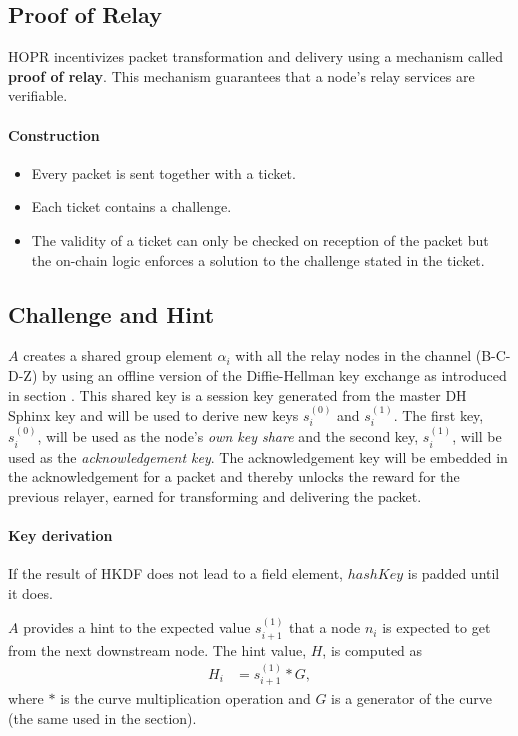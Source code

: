 \subsection{Proof of Relay}
\label{sec:proofofrelay}

HOPR incentivizes packet transformation and delivery using a mechanism called \textbf{proof of relay}. This mechanism guarantees that a node's relay services are verifiable.

\paragraph{Construction}

\begin{itemize}
    \item Every packet is sent together with a ticket.
    \item Each ticket contains a challenge.
    \item The validity of a ticket can only be checked on reception of the packet but the on-chain logic enforces a solution to the challenge stated in the ticket.
\end{itemize}

\subsection{Challenge and Hint}
\label{sec:PoR:Challenge}

$A$ creates a shared group element $\alpha_i$ with all the relay nodes in the channel (B-C-D-Z) by using an offline version of the Diffie-Hellman key exchange as introduced in section . This shared key is a session key generated from the master DH Sphinx key and will be used to derive new keys $s_i^{(0)}$ and $s_{i}^{(1)}$.  The first key, $s_i^{(0)}$, will be used as the node's \textit{own key share} and the second key, $s_i^{(1)}$, will be used as the \textit{acknowledgement key}. The acknowledgement key will be embedded in the acknowledgement for a packet and thereby unlocks the reward for the previous relayer, earned for transforming and delivering the packet.

\paragraph{Key derivation}


If the result of HKDF does not lead to a field element, $hashKey$ is padded until it does.

$A$ provides a hint to the expected value $s_{i+1}^{(1)}$ that a node $n_i$ is expected to get from the next downstream node.
The hint value, $H$, is computed as
\begin{align}
    H_i & =s_{i+1}^{(1)}*G,
\end{align}
where $*$ is the curve multiplication operation and $G$ is a generator of the curve (the same used in the  section).

